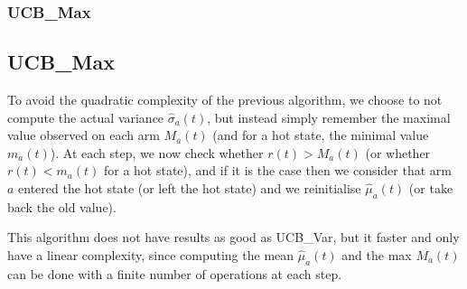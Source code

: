 \documentclass[french]{beamer}
\begin{document}
\begin{frame}
	\frametitle{UCB\_Max}
	
	\subsection{UCB\_Max}
	
	To avoid the quadratic complexity of the previous algorithm, we choose to not compute
	the actual variance $\hat\sigma_a(t)$, but instead simply remember the maximal value
	observed on each arm $M_a(t)$ (and for a hot state, the minimal value $m_a(t)$).
	At each step, we now check whether $r(t) > M_a(t)$ (or whether $r(t) < m_a(t)$ for a hot state),
	and if it is the case then we consider that arm $a$ entered the hot state (or left the hot state)
	and we reinitialise $\hat\mu_a(t)$ (or take back the old value).
	
	This algorithm does not have results as good as UCB\_Var, but it faster and only have
	a linear complexity, since computing the mean $\hat\mu_a(t)$ and the max $M_a(t)$
	can be done with a finite number of operations at each step.
	
\end{frame}
\end{document}
